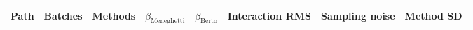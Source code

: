 \begin{tabular}{llrrrrrr}
\hline
Path & Batches & Methods & $\beta_{\mathrm{Meneghetti}}$ & $\beta_{\mathrm{Berto}}$ & Interaction RMS & Sampling noise & Method SD \\
\hline
\hline
\end{tabular}
